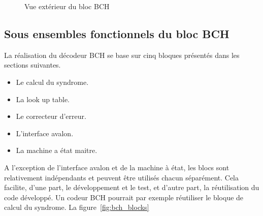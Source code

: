 \documentclass[a4paper, 11pt, svgnames]{report}
\begin{document}
            \begin{figure}[H]
                \centering
                \caption{Vue extérieur du bloc BCH}
                \label{fig:bch}
            \end{figure}

            \subsection{Sous ensembles fonctionnels du bloc BCH}
            \label{sec:fonc_bch}
            La réalisation du décodeur BCH se base sur cinq bloques présentés
            dans les sections suivantes.
            \begin{itemize}
                \item Le calcul du syndrome.
                \item La look up table.
                \item Le correcteur d'erreur.
                \item L'interface avalon.
                \item La machine a état maitre.
            \end{itemize}
            A l'exception de l'interface avalon et de la machine à état, les
            blocs sont relativement indépendants et peuvent être utilisés
            chacun séparément. Cela facilite, d'une part, le développement et
            le test, et d'autre part, la réutilisation du code développé. Un
            codeur BCH pourrait par exemple réutiliser le bloque de calcul du
            syndrome. La figure~\ref{fig:bch_blocks}
\end{document}
